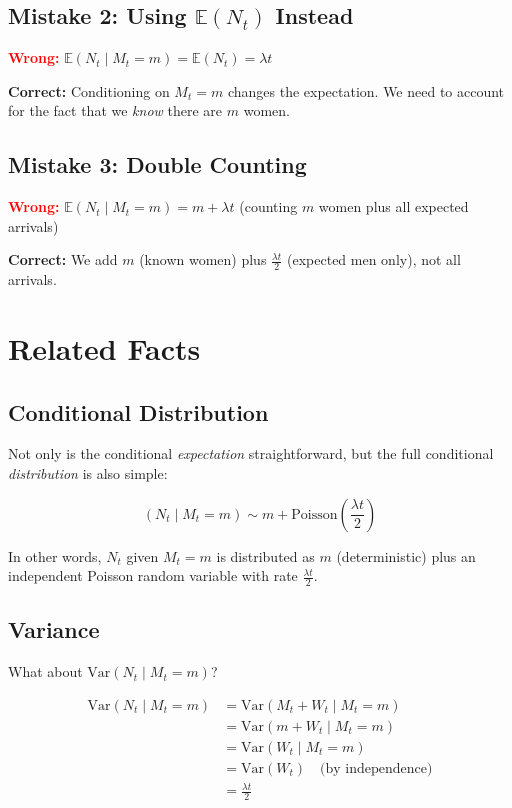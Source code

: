 \documentclass[11pt]{article}
\begin{document}
\subsection{Mistake 2: Using $\mathbb{E}(N_t)$ Instead}

\textcolor{red}{\textbf{Wrong:}} $\mathbb{E}(N_t \mid M_t = m) = \mathbb{E}(N_t) = \lambda t$

\textcolor{green!60!black}{\textbf{Correct:}} Conditioning on $M_t = m$ changes the expectation. We need to account for the fact that we \textit{know} there are $m$ women.

\subsection{Mistake 3: Double Counting}

\textcolor{red}{\textbf{Wrong:}} $\mathbb{E}(N_t \mid M_t = m) = m + \lambda t$ (counting $m$ women plus all expected arrivals)

\textcolor{green!60!black}{\textbf{Correct:}} We add $m$ (known women) plus $\frac{\lambda t}{2}$ (expected men only), not all arrivals.

\section{Related Facts}

\subsection{Conditional Distribution}

Not only is the conditional \textit{expectation} straightforward, but the full conditional \textit{distribution} is also simple:

\[
(N_t \mid M_t = m) \sim m + \text{Poisson}\left(\frac{\lambda t}{2}\right)
\]

In other words, $N_t$ given $M_t = m$ is distributed as $m$ (deterministic) plus an independent Poisson random variable with rate $\frac{\lambda t}{2}$.

\subsection{Variance}

What about $\text{Var}(N_t \mid M_t = m)$?

\begin{align*}
\text{Var}(N_t \mid M_t = m) &= \text{Var}(M_t + W_t \mid M_t = m) \\
&= \text{Var}(m + W_t \mid M_t = m) \\
&= \text{Var}(W_t \mid M_t = m) \\
&= \text{Var}(W_t) \quad \text{(by independence)} \\
&= \frac{\lambda t}{2}
\end{align*}
\end{document}
